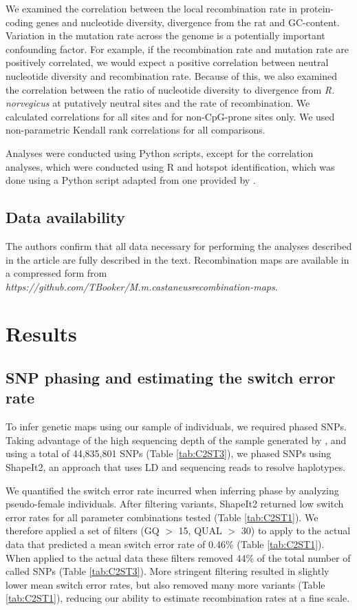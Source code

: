We examined the correlation between the local recombination rate in protein-coding genes and nucleotide diversity, divergence from the rat and GC-content. Variation in the mutation rate across the genome is a potentially important confounding factor. For example, if the recombination rate and mutation rate are positively correlated, we would expect a positive correlation between neutral nucleotide diversity and recombination rate. Because of this, we also examined the correlation between the ratio of nucleotide diversity to divergence from \textit{R. norvegicus} at putatively neutral sites and the rate of recombination. We calculated correlations for all sites and for non-CpG-prone sites only. We used non-parametric Kendall rank correlations for all comparisons.

Analyses were conducted using Python scripts, except for the correlation analyses, which were conducted using R \citep{RN666} and hotspot identification, which was done using a Python script adapted from one provided by \cite{RN258}. 

\subsection{Data availability}

	The authors confirm that all data necessary for performing the analyses described in the article are fully described in the text. Recombination maps are available in a compressed form from \textit{https://github.com/TBooker/M.m.castaneus\textunderscore recombination-maps}.

\section{Results}
 
\subsection{SNP phasing and estimating the switch error rate}
 
To infer genetic maps using our sample of individuals, we required phased SNPs. Taking advantage of the high sequencing depth of the sample generated by \cite{RN122}, and using a total of 44,835,801 SNPs (Table \ref{tab:C2ST3}), we phased SNPs using ShapeIt2, an approach that uses LD and sequencing reads to resolve haplotypes. 
 
We quantified the switch error rate incurred when inferring phase by analyzing pseudo-female individuals. After filtering variants, ShapeIt2 returned low switch error rates for all parameter combinations tested (Table \ref{tab:C2ST1}). We therefore applied a set of filters (GQ $>$ 15, QUAL $>$ 30) to apply to the actual data that predicted a mean switch error rate of 0.46\% (Table \ref{tab:C2ST1}). When applied to the actual data these filters removed 44\% of the total number of called SNPs (Table \ref{tab:C2ST3}). More stringent filtering resulted in slightly lower mean switch error rates, but also removed many more variants (Table \ref{tab:C2ST1}), reducing our ability to estimate recombination rates at a fine scale.
 
